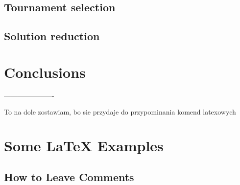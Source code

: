 \documentclass[a4paper]{article}
\begin{document}
\subsection{Tournament selection}

\begin{table}[h]
\centering
\caption{Tournament selection}
\label{table:tournament}
\end{table}


\subsection{Solution reduction}


\section{Conclusions}


----------------------

To na dole zostawiam, bo sie przydaje do przypominania komend latexowych



\section{Some \LaTeX{} Examples}
\label{sec:examples}

\subsection{How to Leave Comments}
\end{document}
